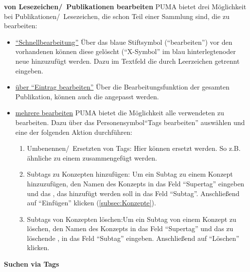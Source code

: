 \textbf{\tags von Lesezeichen/~Publikationen bearbeiten} \newline
PUMA bietet drei Möglichkeit bei Publikationen/~Lesezeichen, die schon Teil einer Sammlung sind, die \tags zu bearbeiten: 
\begin{itemize}
    \item \underline{\enquote{Schnellbearbeitung}}\newline
   Über das blaue Stiftsymbol (\enquote{\tags bearbeiten}) vor den vorhandenen \tags können diese gelöscht (\enquote{X-Symbol} im blau hinterlegten\tag oder neue hinzuzufügt werden. Dazu im Textfeld die \tags durch Leerzeichen getrennt eingeben.
    \item \underline{über \enquote{Eintrag bearbeiten}}\newline
    Über die Bearbeitungsfunktion der gesamten Publikation, können auch die \tags angepasst werden. 
    \item \underline{mehrere \tags bearbeiten}\newline
    PUMA bietet die Möglichkeit alle verwendeten \tags zu bearbeiten. Dazu über das Personensymbol\enquote{Tags bearbeiten} auswählen und eine der folgenden Aktion durchführen:
    \begin{enumerate}
        \item Umbenennen/~Ersetzten von Tags: \newline Hier können \tags ersetzt werden. So z.B. ähnliche \tags zu einem \tag zusammengefügt werden.
        \item Subtags zu Konzepten hinzufügen: \newline
        Um ein Subtag zu einem Konzept hinzuzufügen, den Namen des Konzepts in das Feld \enquote{Supertag} eingeben und das \tag, das hinzufügt werden soll in das Feld \enquote{Subtag}. Anschließend auf \enquote{Einfügen} klicken (\autoref{subsec:Konzepte}).
        \item Subtags von Konzepten löschen:\newline Um ein Subtag von einem Konzept zu löschen, den Namen des Konzepts in das Feld \enquote{Supertag} und das zu löschende \tag, in das Feld \enquote{Subtag} eingeben. Anschließend auf \enquote{Löschen} klicken.
    \end{enumerate}
\end{itemize}
\textbf{Suchen via Tags}\newline
